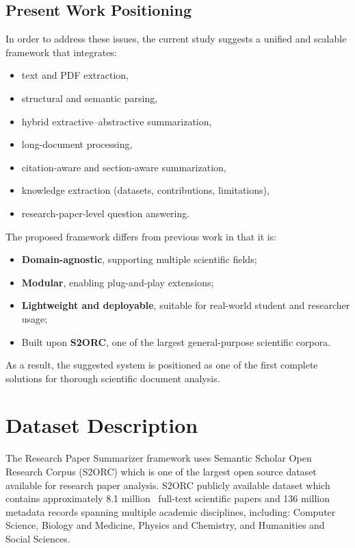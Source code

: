 \documentclass[conference]{IEEEtran}
\begin{document}
\subsection{Present Work Positioning}
In order to address these issues, the current study suggests a unified and scalable framework that integrates:
\begin{itemize}
    \item text and PDF extraction,
    \item structural and semantic parsing,
    \item hybrid extractive--abstractive summarization,
    \item long-document processing,
    \item citation-aware and section-aware summarization,
    \item knowledge extraction (datasets, contributions, limitations),
    \item research-paper-level question answering.
\end{itemize}

The proposed framework differs from previous work in that it is:
\begin{itemize}
    \item \textbf{Domain-agnostic}, supporting multiple scientific fields;
    \item \textbf{Modular},  enabling plug-and-play extensions;
    \item \textbf{Lightweight and deployable}, suitable for real-world student and researcher usage;
    \item Built upon \textbf{S2ORC}, one of the largest general-purpose scientific corpora.
\end{itemize}

As a result, the suggested system is positioned as one of the first complete solutions for thorough scientific document analysis.






\section{Dataset Description}

The Research Paper Summarizer framework uses Semantic Scholar Open Research Corpus (S2ORC) which is one of the largest open source dataset available for research paper analysis. S2ORC publicly available dataset which contains approximately 8.1 million  full-text scientific papers and 136 million metadata records spanning multiple academic disciplines, including: Computer Science, Biology and Medicine, Physics and Chemistry, and Humanities and Social Sciences.
\end{document}
